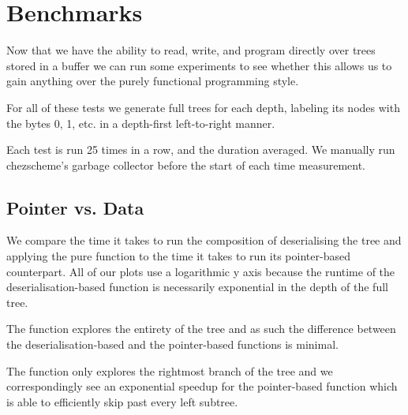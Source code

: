 


\section{Benchmarks}\label{sec:timing}

Now that we have the ability to read, write, and program directly
over trees stored in a buffer we can run some experiments to see
whether this allows us to gain anything over the purely functional
programming style.

For all of these tests we generate full trees for each depth,
labeling its nodes with the bytes 0, 1, etc. in a depth-first
left-to-right manner.

Each test is run 25 times in a row, and the duration averaged.
%
We manually run chezscheme's garbage collector before the start of
each time measurement.


\subsection{Pointer vs. Data}

We compare the time it takes to run the composition of deserialising
the tree and applying the pure function to the time it takes to run
its pointer-based counterpart.
%
All of our plots use a logarithmic y axis because the runtime of the
deserialisation-based function is necessarily exponential in the depth
of the full tree.

The  function explores the entirety of the tree
and as such the difference between the deserialisation-based and the
pointer-based functions is minimal.

\noindent
\begin{minipage}{.5\textwidth}
\end{minipage}\hfill
\begin{minipage}{.45\textwidth}
\end{minipage}

The  function only explores the rightmost
branch of the tree and we correspondingly see an exponential speedup
for the pointer-based function which is able to efficiently skip past
every left subtree.

\noindent
\begin{minipage}{.5\textwidth}
\end{minipage}\hfill
\begin{minipage}{.45\textwidth}
\end{minipage}

